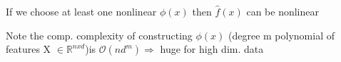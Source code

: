 If we choose at least one nonlinear $\phi(x)$ then $\hat{f}(x)$ can be nonlinear

Note the comp. complexity of constructing $\phi(x)$ (degree m polynomial of features X $\in \mathbb{R}^{nxd}$)is $\mathcal{O}(nd^m) \Rightarrow$ huge for high dim. data




\vfill\null \columnbreak


